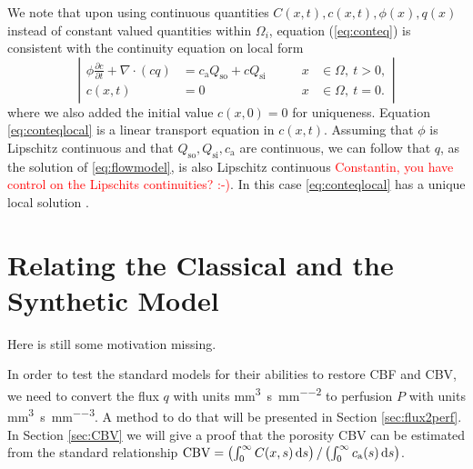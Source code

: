 \documentclass[paper=a4, fontsize=11pt,parskip=half,headings=small]{scrartcl}
\newcommand{\Qso}{Q_{\mathrm{so}}}
\newcommand{\Qsi}{Q_{\mathrm{si}}}
\newcommand{\ca}{c_\mathrm{a}}
\newcommand{\CBV}{\mathrm{CBV}}
\newcommand{\siq}{\milli\meter\cubed\per\second\per\milli\meter\squared}
\newcommand{\siP}{\milli\meter\cubed\per\second\per\milli\meter\cubed}
\begin{document}
	We note that upon using continuous quantities $C(x,t),c(x,t),\phi(x),q(x)$ instead of constant valued quantities within $\Omega_i$, equation (\ref{eq:conteq}) is consistent with the continuity equation on local form
	\begin{equation}
		\left\vert
		\begin{alignedat}{2}
			\phi \frac{\partial c}{\partial t} + \nabla \cdot (cq) &= \ca\Qso + c\Qsi \qquad	&x &\in \Omega, \ t>0,  \\
			c(x,t) &= 0 																			 	&x &\in \Omega, \ t=0.
		\end{alignedat}
		\right\vert
		\label{eq:conteqlocal}
	\end{equation}
	where we also added the initial value $c(x,0) = 0$ for uniqueness.
	Equation \eqref{eq:conteqlocal} is a linear transport equation in $c(x,t)$. 
	Assuming that $\phi$ is Lipschitz continuous and that $\Qso,\Qsi,\ca$ are continuous, we can follow that $q$, as the solution of \eqref{eq:flowmodel}, is also Lipschitz continuous \textcolor{red}{Constantin, you have control on the Lipschits continuities? :-)}.
	In this case \eqref{eq:conteqlocal} has a unique local solution \cite{evans98}.
	


	\section{Relating the Classical and the Synthetic Model}\label{sec:relation}
	Here is still some motivation missing.
	
	In order to test the standard models for their abilities to restore CBF and CBV, we need to convert the flux $q$ with units \si{\siq} to perfusion $P$ with units \si{\siP}. 
	A method to do that will be presented in Section \ref{sec:flux2perf}.
	In Section \ref{sec:CBV} we will give a proof that the porosity CBV can be estimated from the standard relationship $\CBV = \left(\int_0^\infty C(x,s) \diffint s\right)/\left(\int_0^\infty \ca(s) \diffint s\right)$.
	
	
	
\end{document}
